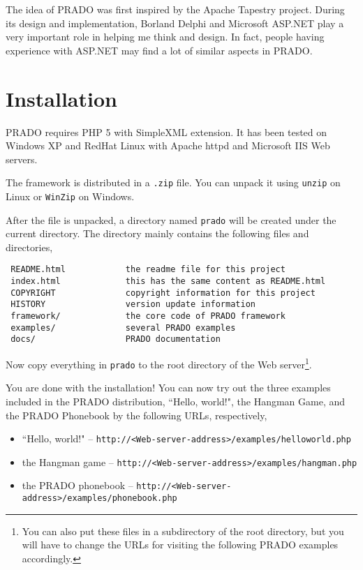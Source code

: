 \documentclass{book}
\begin{document}
The idea of PRADO was first inspired by the Apache Tapestry
project. During its design and implementation, Borland Delphi and
Microsoft ASP.NET play a very important role in helping me think
and design. In fact, people having experience with ASP.NET may
find a lot of similar aspects in PRADO.


\section{Installation}

PRADO requires PHP 5 with SimpleXML extension. It has been tested
on Windows XP and RedHat Linux with Apache httpd and Microsoft IIS
Web servers.


The framework is distributed in a \verb|.zip| file. You can unpack
it using \verb|unzip| on Linux or \verb|WinZip| on Windows.


After the file is unpacked, a directory named \verb|prado| will be
created under the current directory. The directory mainly contains
the following files and directories,
\begin{verbatim}
 README.html            the readme file for this project
 index.html             this has the same content as README.html
 COPYRIGHT              copyright information for this project
 HISTORY                version update information
 framework/             the core code of PRADO framework
 examples/              several PRADO examples
 docs/                  PRADO documentation
\end{verbatim}


Now copy everything in \verb|prado| to the root directory of the
Web server\footnote{You can also put these files in a subdirectory
of the root directory, but you will have to change the URLs for
visiting the following PRADO examples accordingly.}.


You are done with the installation! You can now try out the three
examples included in the PRADO distribution, ``Hello, world!", the
Hangman Game, and the PRADO Phonebook by the following URLs,
respectively,
\begin{itemize}
\item ``Hello, world!" --
\verb|http://<Web-server-address>/examples/helloworld.php|

\item the Hangman game --
\verb|http://<Web-server-address>/examples/hangman.php|

\item the PRADO phonebook --
\verb|http://<Web-server-address>/examples/phonebook.php|
\end{itemize}
\end{document}
